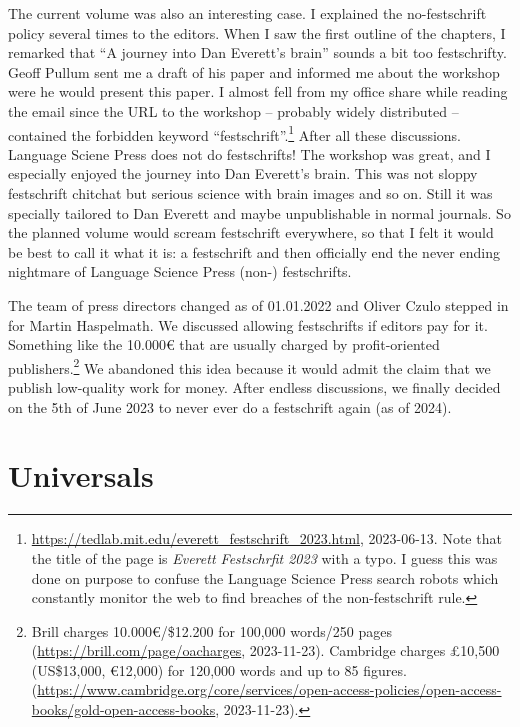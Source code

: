 \documentclass[output=paper,colorlinks,citecolor=brown]{langscibook}
\begin{document}
The current volume was also an interesting case. I explained the no-festschrift policy several
times to the editors. When I saw the first outline of the chapters, I remarked that ``A journey into Dan Everett's
brain'' sounds a bit too festschrifty. Geoff Pullum sent me a draft of his paper and informed me
about the workshop were he would present this paper. I almost fell from my office share while
reading the email since the URL to the workshop -- probably widely distributed -- contained the forbidden keyword
``festschrift''.\footnote{
\url{https://tedlab.mit.edu/everett_festschrift_2023.html}, 2023-06-13. Note that the title of the
page is \emph{Everett Festschrfit 2023} with a typo. I guess this was done on purpose to confuse the
Language Science Press search robots which constantly monitor the web to find breaches of the
non-festschrift rule.
} After all these discussions. Language Sciene Press does not do festschrifts! The
workshop was great, and I especially enjoyed the journey into Dan Everett's brain. This was not
sloppy festschrift chitchat but serious science with brain images and so on. Still it was specially
tailored to Dan Everett and maybe unpublishable in normal journals. So the planned volume would
scream festschrift everywhere, so that I felt it would be best to call it what it is: a festschrift
and then officially end the never ending nightmare of Language Science Press (non-) festschrifts. 

The team of press directors changed as of 01.01.2022 and Oliver Czulo stepped in for
Martin Haspelmath. We discussed allowing festschrifts if editors pay for it. Something like the
10.000€ that are usually charged by profit-oriented publishers.\footnote{
Brill charges 10.000€/\$12.200 for 100,000 words/250 pages (\url{https://brill.com/page/oacharges},
2023-11-23). Cambridge charges £10,500 (US\$13,000, €12,000) for 120,000 words and up to 85 figures.
(\url{https://www.cambridge.org/core/services/open-access-policies/open-access-books/gold-open-access-books}, 2023-11-23).
} 
 We abandoned this idea because it
would admit the claim that we publish low-quality work for money. After endless discussions, we
finally decided on the 5th of June 2023 to never ever do a festschrift again (as of 2024). 






\section{Universals}
\end{document}
